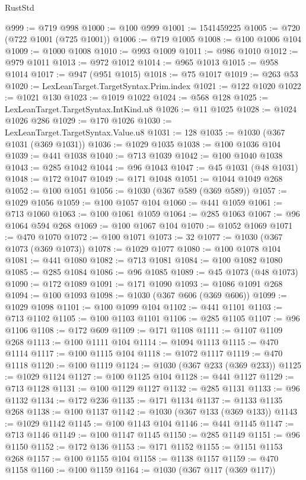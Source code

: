 \begin{lexlean}{RustStd}
\begin{coremodule}
@999 := @719 @998
@1000 := @100 @999
@1001 := 1541459225
@1005 := @720 (@722 @1001 (@725 @1001))
@1006 := @719 @1005
@1008 := @100 @1006 @104
@1009 := @1000 @1008
@1010 := @993 @1009
@1011 := @986 @1010
@1012 := @979 @1011
@1013 := @972 @1012
@1014 := @965 @1013
@1015 := @958 @1014
@1017 := @947 (@951 @1015)
@1018 := @75 @1017
@1019 := @263 @53
@1020 := LexLeanTarget.TargetSyntax.Prim.index
@1021 := @122 @1020
@1022 := @1021 @130
@1023 := @1019 @1022
@1024 := @568 @128
@1025 := LexLeanTarget.TargetSyntax.IntKind.u8
@1026 := @11 @1025
@1028 := @1024 @1026 @286
@1029 := @170 @1026
@1030 := LexLeanTarget.TargetSyntax.Value.u8
@1031 := 128
@1035 := @1030 (@367 @1031 (@369 @1031))
@1036 := @1029 @1035
@1038 := @100 @1036 @104
@1039 := @441 @1038
@1040 := @713 @1039
@1042 := @100 @1040 @1038
@1043 := @285 @1042
@1044 := @96 @1043
@1047 := @45 @1031 (@48 @1031)
@1048 := @172 @1047
@1049 := @171 @1048
@1051 := @1044 @1049 @268
@1052 := @100 @1051
@1056 := @1030 (@367 @589 (@369 @589))
@1057 := @1029 @1056
@1059 := @100 @1057 @104
@1060 := @441 @1059
@1061 := @713 @1060
@1063 := @100 @1061 @1059
@1064 := @285 @1063
@1067 := @96 @1064 @594 @268
@1069 := @100 @1067 @104
@1070 := @1052 @1069
@1071 := @470 @1070
@1072 := @100 @1071
@1073 := 32
@1077 := @1030 (@367 @1073 (@369 @1073))
@1078 := @1029 @1077
@1080 := @100 @1078 @104
@1081 := @441 @1080
@1082 := @713 @1081
@1084 := @100 @1082 @1080
@1085 := @285 @1084
@1086 := @96 @1085
@1089 := @45 @1073 (@48 @1073)
@1090 := @172 @1089
@1091 := @171 @1090
@1093 := @1086 @1091 @268
@1094 := @100 @1093
@1098 := @1030 (@367 @606 (@369 @606))
@1099 := @1029 @1098
@1101 := @100 @1099 @104
@1102 := @441 @1101
@1103 := @713 @1102
@1105 := @100 @1103 @1101
@1106 := @285 @1105
@1107 := @96 @1106
@1108 := @172 @609
@1109 := @171 @1108
@1111 := @1107 @1109 @268
@1113 := @100 @1111 @104
@1114 := @1094 @1113
@1115 := @470 @1114
@1117 := @100 @1115 @104
@1118 := @1072 @1117
@1119 := @470 @1118
@1120 := @100 @1119
@1124 := @1030 (@367 @233 (@369 @233))
@1125 := @1029 @1124
@1127 := @100 @1125 @104
@1128 := @441 @1127
@1129 := @713 @1128
@1131 := @100 @1129 @1127
@1132 := @285 @1131
@1133 := @96 @1132
@1134 := @172 @236
@1135 := @171 @1134
@1137 := @1133 @1135 @268
@1138 := @100 @1137
@1142 := @1030 (@367 @133 (@369 @133))
@1143 := @1029 @1142
@1145 := @100 @1143 @104
@1146 := @441 @1145
@1147 := @713 @1146
@1149 := @100 @1147 @1145
@1150 := @285 @1149
@1151 := @96 @1150
@1152 := @172 @136
@1153 := @171 @1152
@1155 := @1151 @1153 @268
@1157 := @100 @1155 @104
@1158 := @1138 @1157
@1159 := @470 @1158
@1160 := @100 @1159
@1164 := @1030 (@367 @117 (@369 @117))

\end{coremodule}
\end{lexlean}
